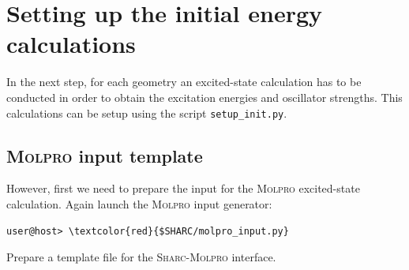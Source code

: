 \documentclass[a4paper,11pt,DIV=15,openany]{scrbook}
\newcommand{\sharc}{\textsc{Sharc}}
\newcommand{\ttt}[1]{\texttt{#1}}
\begin{document}
\clearpage
\section{Setting up the initial energy calculations}

In the next step, for each geometry an excited-state calculation has to be conducted in order to obtain the excitation energies and oscillator strengths. This calculations can be setup using the script \ttt{setup\_init.py}. 

\subsection{\textsc{Molpro} input template}

However, first we need to prepare the input for the \textsc{Molpro} excited-state calculation. Again launch the \textsc{Molpro} input generator:
\begin{Verbatim}[commandchars=\\\{\}]
user@host> \textcolor{red}{$SHARC/molpro_input.py}
\end{Verbatim}
Prepare a template file for the \sharc-\textsc{Molpro} interface.
\end{document}
